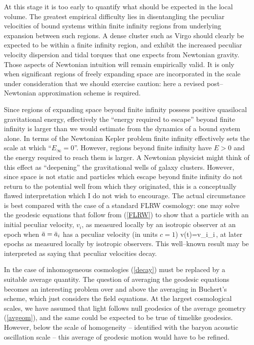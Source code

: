 \documentclass[12pt]{article}
\begin{document}
At this stage it is too early to quantify what should be expected in the
local volume. The greatest empirical difficulty lies in disentangling the
peculiar velocities of bound systems within finite infinity regions from
underlying expansion between such regions. A dense cluster such as
Virgo should clearly be expected to be within a finite infinity region,
and exhibit the increased peculiar velocity dispersion and tidal torques
that one expects from Newtonian gravity. Those aspects of Newtonian
intuition will remain empirically valid. It is only when significant
regions of freely expanding space are incorporated in the scale under
consideration that we should exercise caution: here a revised
post--Newtonian approximation scheme is required.

Since regions of expanding space beyond finite infinity possess positive
quasilocal gravitational energy, effectively the ``energy required to escape''
beyond finite infinity is larger than we would estimate from the dynamics
of a bound system alone. In terms of the Newtonian Kepler problem finite
infinity effectively sets the scale at which ``$E_\infty=0$''. However,
regions beyond finite infinity have $E>0$ and the energy required to reach
them is larger. A Newtonian physicist might think of this effect as
``deepening'' the gravitational wells of galaxy clusters. However, since
space is not static and particles which escape beyond finite infinity do
not return to the potential well from which they originated,
this is a conceptually flawed interpretation which I do
not wish to encourage. The actual circumstance is best compared with the
case of a standard FLRW cosmology: one may solve the geodesic equations
that follow from (\ref{FLRW}) to show that a particle with an initial peculiar
velocity, $v_i$, as measured locally by an isotropic observer at an epoch
when ${\bar a}={\bar a}_i$ has a peculiar velocity (in units $c=1$)
\beq v(t)={v_i\ab_i\over{}}\,,
\label{decay}\eeq
at later epochs as measured locally by isotropic observers. This well--known
result may be interpreted as saying that peculiar velocities decay.

In the case of inhomogeneous cosmologies (\ref{decay}) must be replaced by a
suitable average quantity. The question of averaging the geodesic equations
becomes an interesting problem over and above the averaging in Buchert's
scheme, which just considers the field equations. At the largest cosmological
scales, we have assumed that light follows null geodesics of the average
geometry (\ref{avgeom}), and the same could be expected to be true of
timelike geodesics. However, below the scale of homogeneity -- identified
with the baryon acoustic oscillation scale -- this average of geodesic
motion would have to be refined.
\end{document}
